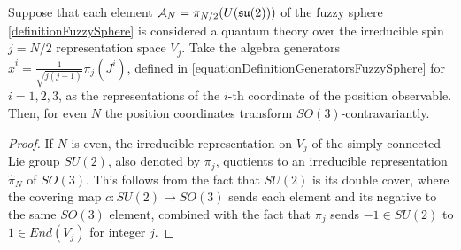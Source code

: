 \begin{proposition}\label{propositionMadoreISSO3Covariant}
Suppose that each element $\mathcal A_N = \pi_{N/2}(U(\mathfrak{su}(2)))$ of the fuzzy sphere \ref{definitionFuzzySphere} is considered a quantum theory over the irreducible spin $j = N/2$ representation space $V_{j}$. Take the algebra generators $\hat x^i = \frac{1}{\sqrt{j(j+1)}}\pi_j(J^i)$, defined in \ref{equationDefinitionGeneratorsFuzzySphere} for $i = 1, 2, 3$, as the representations of the $i$-th coordinate of the position observable. Then, for even $N$ the position coordinates transform $SO(3)$-contravariantly.
\end{proposition}
\begin{proof}
If $N$ is even, the irreducible representation on $V_j$ of the simply connected Lie group $SU(2)$, also denoted by $\pi_j$, quotients to an irreducible representation $\hat \pi_N$ of $SO(3)$. This follows from the fact that $SU(2)$ is its double cover, where the covering map $c:SU(2) \to SO(3)$ sends each element and its negative to the same $SO(3)$ element, combined with the fact that $\pi_j$ sends $-1 \in SU(2)$ to $1 \in End(V_j)$ for integer $j$.


\end{proof}
